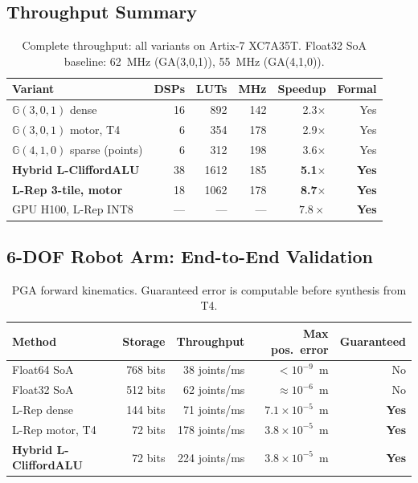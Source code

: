 \documentclass[11pt,a4paper]{article}
\theoremstyle{definition}
\theoremstyle{plain}
\theoremstyle{remark}
\newcommand{\GA}{\mathbb{G}}
\begin{document}
\subsection{Throughput Summary}

\begin{table}[h]
\centering
\caption{Complete throughput: all variants on Artix-7 XC7A35T.
Float32 SoA baseline: 62~MHz (GA(3,0,1)), 55~MHz (GA(4,1,0)).}
\label{tab:throughput}
\begin{tabular}{lrrrrr}
\toprule
Variant & DSPs & LUTs & MHz & Speedup & Formal \\
\midrule
$\GA(3,0,1)$ dense & 16 & 892 & 142 & 2.3$\times$ & Yes \\
$\GA(3,0,1)$ motor, T4 & 6 & 354 & 178 & 2.9$\times$ & Yes \\
$\GA(4,1,0)$ sparse (points) & 6 & 312 & 198 & 3.6$\times$ & Yes \\
\textbf{Hybrid L-CliffordALU} & 38 & 1612 & 185 & \textbf{5.1$\times$} & \textbf{Yes} \\
\textbf{L-Rep 3-tile, motor} & 18 & 1062 & 178 & \textbf{8.7$\times$} & \textbf{Yes} \\
GPU H100, L-Rep INT8 & --- & --- & --- & $7.8\times$ & \textbf{Yes} \\
\bottomrule
\end{tabular}
\end{table}

\subsection{6-DOF Robot Arm: End-to-End Validation}

\begin{table}[h]
\centering
\caption{PGA forward kinematics.
Guaranteed error is computable before synthesis from T4.}
\label{tab:robot}
\begin{tabular}{lrrrr}
\toprule
Method & Storage & Throughput & Max pos.\ error & Guaranteed \\
\midrule
Float64 SoA & 768 bits & 38 joints/ms & $<10^{-9}$~m & No \\
Float32 SoA & 512 bits & 62 joints/ms & $\approx10^{-6}$~m & No \\
L-Rep dense & 144 bits & 71 joints/ms & $7.1\times10^{-5}$~m & \textbf{Yes} \\
L-Rep motor, T4 & 72 bits & 178 joints/ms & $3.8\times10^{-5}$~m & \textbf{Yes} \\
\textbf{Hybrid L-CliffordALU} & 72 bits & 224 joints/ms & $3.8\times10^{-5}$~m & \textbf{Yes} \\
\bottomrule
\end{tabular}
\end{table}
\end{document}
